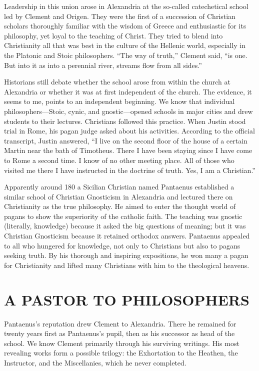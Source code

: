 Leadership in this union arose in Alexandria at the so-called catechetical school led by Clement and
Origen. They were the first of a succession of Christian scholars thoroughly familiar with the
wisdom of Greece and enthusiastic for its philosophy, yet loyal to the teaching of Christ. They
tried to blend into Christianity all that was best in the culture of the Hellenic world, especially
in the Platonic and Stoic philosophers. “The way of truth,” Clement said, “is one. But into it as
into a perennial river, streams flow from all sides.”

Historians still debate whether the school arose from within the church at Alexandria or whether it
was at first independent of the church. The evidence, it seems to me, points to an independent
beginning. We know that individual philosophers—Stoic, cynic, and gnostic—opened schools in major
cities and drew students to their lectures. Christians followed this practice. When Justin stood
trial in Rome, his pagan judge asked about his activities. According to the official transcript,
Justin answered, “I live on the second floor of the house of a certain Martin near the bath of
Timotheus. There I have been staying since I have come to Rome a second time. I know of no other
meeting place. All of those who visited me there I have instructed in the doctrine of truth. Yes, I
am a Christian.”

Apparently around 180 a Sicilian Christian named Pantaenus established a similar school of Christian
Gnosticism in Alexandria and lectured there on Christianity as the true philosophy. He aimed to
enter the thought world of pagans to show the superiority of the catholic faith. The teaching was
gnostic (literally, knowledge) because it asked the big questions of meaning; but it was Christian
Gnosticism because it retained orthodox answers. Pantaenus appealed to all who hungered for
knowledge, not only to Christians but also to pagans seeking truth. By his thorough and inspiring
expositions, he won many a pagan for Christianity and lifted many Christians with him to the
theological heavens.

\section{A PASTOR TO PHILOSOPHERS}

Pantaenus’s reputation drew Clement to Alexandria. There he remained for twenty years first as
Pantaenus’s pupil, then as his successor as head of the school. We know Clement primarily through
his surviving writings. His most revealing works form a possible trilogy: the Exhortation to the
Heathen, the Instructor, and the Miscellanies, which he never completed.

